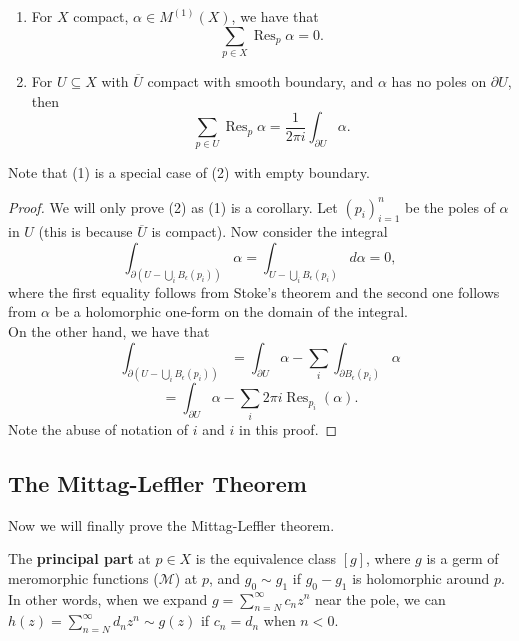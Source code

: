 \documentclass{article}
\begin{document}
{\begin{theorem}
    \begin{enumerate}
        \item For $X$ compact, $\alpha \in M^{(1)}(X)$, we have that
        \[\sum_{p \in X} \operatorname{Res}_p \alpha = 0.\]
        \item For $U \subseteq X$ with $\overline{U}$ compact with smooth boundary, and $\alpha$ has no poles on $\partial U$, then
        \[\sum_{p \in U} \operatorname{Res}_p \alpha = \frac{1}{2\pi i} \int_{\partial U} \alpha.\]
    \end{enumerate}
    Note that (1) is a special case of (2) with empty boundary.
\end{theorem}

\begin{proof}
    We will only prove (2) as (1) is a corollary. Let $(p_i)_{i=1}^n$ be the poles of $\alpha$ in $U$ (this is because $\overline{U}$ is compact). Now consider the integral
    \[\int_{\partial (U - \bigcup_{i} B_\epsilon(p_i))} \alpha = \int_{U - \bigcup_{i} B_\epsilon(p_i)} d\alpha = 0,\]
    where the first equality follows from Stoke's theorem and the second one follows from $\alpha$ be a holomorphic one-form on the domain of the integral.\\

    On the other hand, we have that
    \[\int_{\partial (U - \bigcup_{i} B_\epsilon(p_i))}  = \int_{\partial U} \alpha - \sum_{i} \int_{\partial B_\epsilon(p_i)} \alpha \]
    \[= \int_{\partial U} \alpha - \sum_{i} 2\pi i \operatorname{Res}_{p_i}(\alpha).\]
    Note the abuse of notation of $i$ and $i$ in this proof.
\end{proof}

\subsection{The Mittag-Leffler Theorem}

Now we will finally prove the Mittag-Leffler theorem.

\begin{definition}
    The \textbf{principal part} at $p \in X$ is the equivalence class $[g]$, where $g$ is a germ of meromorphic functions ($\mathcal{M}$) at $p$, and $g_0 \sim g_1$ if $g_0 - g_1$ is holomorphic around $p$. In other words, when we expand $g = \sum_{n = N}^\infty c_n z^n$ near the pole, we can $h(z) = \sum_{n = N}^\infty d_n z^n \sim g(z)$ if $c_n = d_n$ when $n < 0$.\\


\end{definition}}
\end{document}
